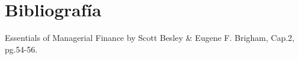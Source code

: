 \documentclass{article}
\begin{document}
\onecolumn



{
\newpage
\section*{Bibliografía}
\begin{enumerate}[label={[\arabic*]}]
    \item Essentials of Managerial Finance by Scott Besley \& Eugene F. Brigham, Cap.2, pg.54-56.
\end{enumerate}
}
\end{document}
